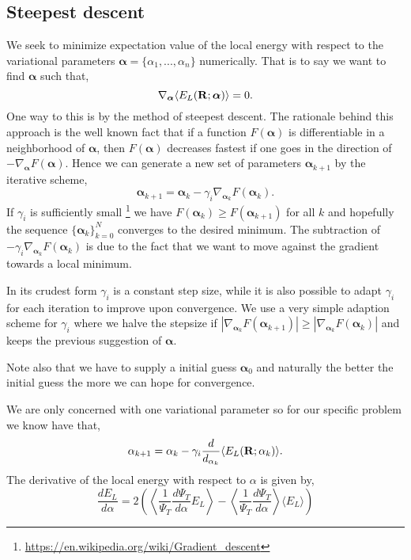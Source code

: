 \documentclass[a4paper,10pt]{article}
\begin{document}
\subsection{Steepest descent} \label{Steepest Descent chapter}
We seek to minimize expectation value of the local energy with respect to the variational parameters ${\bm \alpha} = \{\alpha_1,...,\alpha_n \}$ numerically.
That is to say we want to find ${\bm \alpha}$ such that,
\begin{equation}
 \nabla_{{\bm \alpha}} \langle E_L({\bf R}; {\bm \alpha}) \rangle = 0.
\end{equation}
One way to this is by the method of steepest descent. The rationale behind this approach is the well known fact that if
a function $F({\bm \alpha})$ is differentiable in a neighborhood of ${\bm \alpha}$, then $F({\bm \alpha})$ decreases fastest if one goes in
the direction of $-\nabla_{{\bm \alpha}}F({\bm \alpha})$. Hence we can generate a new set of parameters ${\bm \alpha}_{k+1}$ by the iterative scheme,
\begin{equation}
 {\bm \alpha}_{k+1} = {\bm \alpha}_{k} - \gamma_i \nabla_{{\bm \alpha}_{k}}F({\bm \alpha}_k).
\end{equation}
If $\gamma_i$ is sufficiently small \footnote{\href{https://en.wikipedia.org/wiki/Gradient_descent}{https://en.wikipedia.org/wiki/Gradient\_descent}} we have $F({\bm \alpha}_k) \geq F({\bm \alpha}_{k+1})$  for all $k$ and hopefully the sequence $\{{\bm \alpha}_k \}_{k=0}^N$ 
converges to the desired minimum. The subtraction of $- \gamma_i \nabla_{{\bm \alpha}_{k}}F({\bm \alpha}_k)$ is due 
to the fact that we want to move against the gradient towards a local minimum. 

In its crudest form $\gamma_i$ is a constant step size, while it is also possible to adapt $\gamma_i$ for each iteration to improve upon 
convergence. We use a very simple adaption scheme for $\gamma_i$ where we halve the stepsize if 
$|\nabla_{{\bm \alpha}_{k}}F({\bm \alpha}_{k+1})| \geq |\nabla_{{\bm \alpha}_{k}}F({\bm \alpha}_k)|$ and keeps the previous suggestion of ${\bm \alpha}$. 

Note also that we have to supply a initial guess ${\bm \alpha}_0$ and naturally the better the initial guess the more we can hope for convergence.

We are only concerned with one variational parameter so for our specific problem we know have that, 
\begin{equation}
 \alpha_{k+1} = \alpha_k - \gamma_i\frac{d}{d_{\alpha_k}}\langle E_L({\bf R}; \alpha_k) \rangle. \label{steepest descent equation}
\end{equation}
The derivative of the local energy with respect to $\alpha$ is given by,
\begin{equation}
\frac{dE_L}{d\alpha} = 2 \left( \left\langle \frac{1}{\Psi_T}\frac{d \Psi_T}{d \alpha} E_L \right\rangle  - \left\langle  \frac{1}{\Psi_T}\frac{d \Psi_T}{d \alpha} \right\rangle \langle E_L \rangle \right)
\end{equation}
\end{document}
